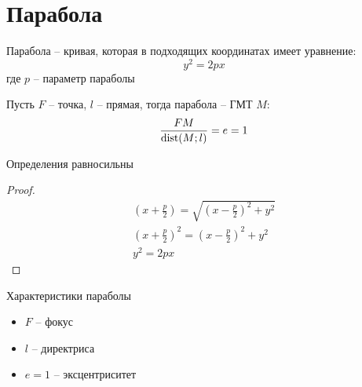 \section{Парабола}
\begin{definition}
    Парабола -- кривая, которая в подходящих координатах имеет уравнение:
    \[y^2=2px\]
    где $p$ -- параметр параболы
\end{definition}
\begin{definition}
    Пусть $F$ -- точка, $l$ -- прямая, тогда парабола -- ГМТ $M$:
    \[\frac{FM}{\operatorname{dist}(M;l)} = e = 1\]
\end{definition}
\begin{theorem}
    Определения равносильны
\end{theorem}
\begin{proof}
    \begin{gather*}
        \left(x + \frac{p}{2}\right) = \sqrt{\left(x-\frac{p}{2}\right)^2 + y^2}\\
        \left(x + \frac{p}{2}\right)^2 = \left(x-\frac{p}{2}\right)^2 + y^2\\
        y^2 = 2px
    \end{gather*}
\end{proof}

Характеристики параболы
\begin{itemize}
    \item $F$ -- фокус
    \item $l$ -- директриса
    \item $e=1$ -- эксцентриситет
\end{itemize}


